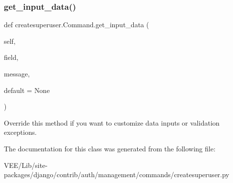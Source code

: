 \subsubsection{\texorpdfstring{get\+\_\+input\+\_\+data()}{get\_input\_data()}}
{\footnotesize\ttfamily def createsuperuser.\+Command.\+get\+\_\+input\+\_\+data (\begin{DoxyParamCaption}\item[{}]{self,  }\item[{}]{field,  }\item[{}]{message,  }\item[{}]{default = {\ttfamily None} }\end{DoxyParamCaption})}

\begin{DoxyVerb}Override this method if you want to customize data inputs or
validation exceptions.
\end{DoxyVerb}
 

The documentation for this class was generated from the following file\+:\begin{DoxyCompactItemize}
\item 
V\+E\+E/\+Lib/site-\/packages/django/contrib/auth/management/commands/createsuperuser.\+py\end{DoxyCompactItemize}
